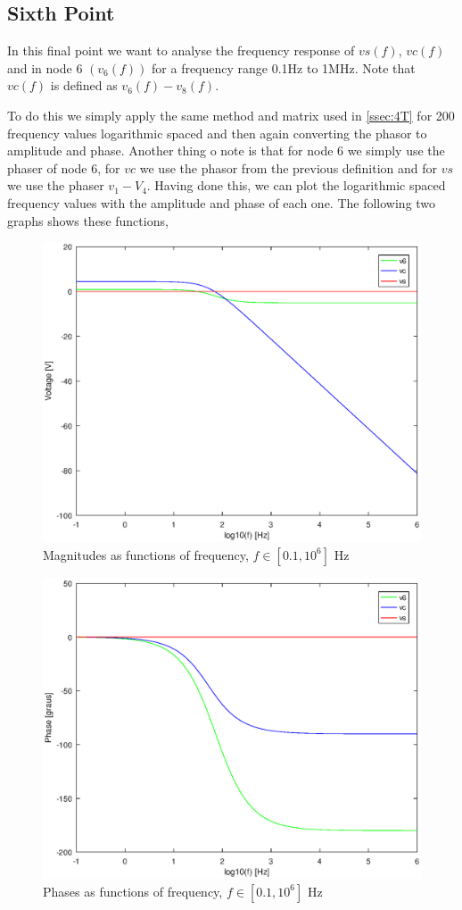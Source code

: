 \subsection{Sixth Point}
\label{ssec:6T}

\par In this final point we want to analyse the frequency response of $vs(f)$, $vc(f)$ and in node 6 $(v_6(f))$ for a frequency range 0.1Hz to 1MHz. Note that $vc(f)$ is defined as $v_6(f)-v_8(f)$.
\par To do this we simply apply the same method and matrix used in \ref{ssec:4T} for 200 frequency values logarithmic spaced and then again converting the phasor to amplitude and phase. Another thing o note is that for node 6 we simply use the phaser of node 6, for $vc$ we use the phasor from the previous definition and for $vs$ we use the phaser $v_1 - V_4$. Having done this, we can plot the logarithmic spaced frequency values with the amplitude and phase of each one. The following two graphs shows these functions, 

\begin{figure}[h] \centering
\includegraphics[width=0.7\linewidth]{magnitude(freq).eps}
\caption{Magnitudes as functions of frequency, $f\in[0.1,10^6]$ Hz}
\label{fig:mag(f)}
\end{figure}

\begin{figure}[h] \centering
\includegraphics[width=0.6\linewidth]{phase(freq).eps}
\caption{Phases as functions of frequency, $f\in[0.1,10^6]$ Hz}
\label{fig:pha(f)}
\end{figure}

